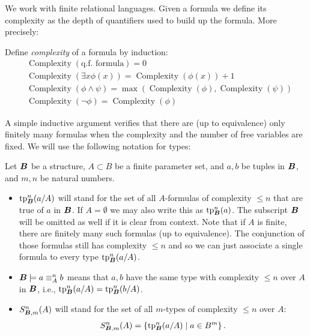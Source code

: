 \documentclass{amsart}
\DeclareMathOperator{\B}{\boldface B}
\DeclareMathOperator{\cx}{Complexity}
\newcommand{\curly}[1]{\left\{#1\right\}}
\begin{document}
We work with finite relational languages.
Given a formula we define its complexity as the depth of quantifiers used to build up the formula. More precisely:
\begin{Definition}
  Define \emph{complexity} of a formula by induction:
  \begin{align*}
    &\cx(\text{q.f. formula}) = 0 \\
    &\cx(\exists x \phi(x)) = \cx(\phi(x)) + 1 \\
    &\cx(\phi \wedge \psi) = \max(\cx(\phi), \cx(\psi)) \\
    &\cx(\neg \phi) = \cx(\phi)
  \end{align*}
\end{Definition}
A simple inductive argument verifies that there are (up to equivalence) only finitely many formulas when the complexity and the number of free variables are fixed.
We will use the following notation for types:
\begin{Definition} Let $\B$ be a structure, $A \subset B$ be a finite parameter set, and $a,b$ be tuples in $\B$, and $m, n$ be natural numbers.
  \begin{itemize}
  \item $\tp^n_{\B}(a/A)$ will stand for the set of all $A$-formulas of complexity $\leq n$ that are true of $a$ in $\B$.
    If $A = \emptyset$ we may also write this as $\tp^n_{\B}(a)$.
    The subscript $\B$ will be omitted as well if it is clear from context.
    Note that if $A$ is finite, there are finitely many such formulas (up to equivalence).
    The conjunction of those formulas still has complexity $\leq n$ and so we can just associate a single formula to every type $\tp^n_{\B}(a/A)$.
  \item $\B \models a \equiv^n_A b$ means that $a,b$ have the same type with complexity $\leq n$ over $A$ in $\B$, i.e., $\tp^n_{\B}(a/A) = \tp^n_{\B}(b/A)$.
  \item $S^n_{\B, m}(A)$ will stand for the set of all $m$-types of complexity $\leq n$ over $A$:
    \begin{align*}
      S^n_{\B, m}(A) = \curly{\tp^n_{\B}(a/A) \mid a \in B^m}.
    \end{align*}
  \end{itemize}
\end{Definition}
\end{document}
